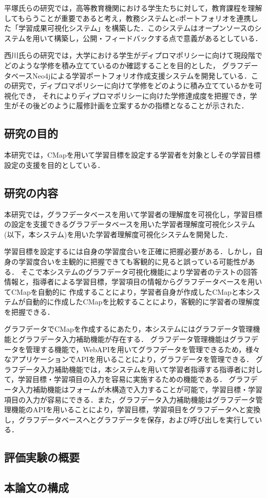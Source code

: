平塚氏らの研究では，高等教育機関における学生たちに対して，教育課程を理解してもらうことが重要であると考え，教務システムとeポートフォリオを連携した「学習成果可視化システム」を構築した．このシステムはオープンソースのシステムを用いて構築し，公開・フィードバックする点で意義があるとしている\cite{hira}．

西川氏らの研究では，大学における学生がディプロマポリシーに向けて現段階でどのような学修を積み立てているのか確認することを目的とした，
グラフデータベースNeo4jによる学習ポートフォリオ作成支援システムを開発している\cite{nisi}．この研究で，ディプロマポリシーに向けて学修をどのように積み立てているかを可視化でき，
それによりディプロマポリシーに向けた学修達成度を把握でき，学生がその後どのように履修計画を立案するかの指標となることが示された．

\subsection{研究の目的}
本研究では，CMapを用いて学習目標を設定する学習者を対象としその学習目標設定の支援を目的としている．

\subsection{研究の内容}
本研究では，グラフデータベースを用いて学習者の理解度を可視化し，学習目標の設定を支援できるグラフデータベースを用いた学習者理解度可視化システム(以下，本システム)を用いた学習者理解度可視化システムを開発した．

学習目標を設定するには自身の学習度合いを正確に把握必要がある．しかし，自身の学習度合いを主観的に把握できても客観的に見ると誤っている可能性がある．
そこで本システムのグラフデータ可視化機能により学習者のテストの回答情報と，指導者による学習目標，学習項目の情報からグラフデータベースを用いてCMapを自動的に
作成することにより，学習者自身が作成したCMapと本システムが自動的に作成したCMapを比較することにより，客観的に学習者の理解度を把握できる．

グラフデータでCMapを作成するにあたり，本システムにはグラフデータ管理機能とグラフデータ入力補助機能が存在する．
グラフデータ管理機能はグラフデータを管理する機能で，WebAPIを用いてグラフデータを管理できるため，様々なアプリケーションでAPIを用いることにより，グラフデータを管理できる．
グラフデータ入力補助機能では，本システムを用いて学習者指導する指導者に対して，学習目標・学習項目の入力を容易に実施するための機能である．
グラフデータ入力補助機能はフォームが木構造で入力することが可能で，学習目標・学習項目の入力が容易にできる．また，グラフデータ入力補助機能はグラフデータ管理機能のAPIを用いることにより，学習目標，学習項目をグラフデータへと変換し，グラフデータベースへとグラフデータを保存，および呼び出しを実行している．


\subsection{評価実験の概要}

\subsection{本論文の構成}
